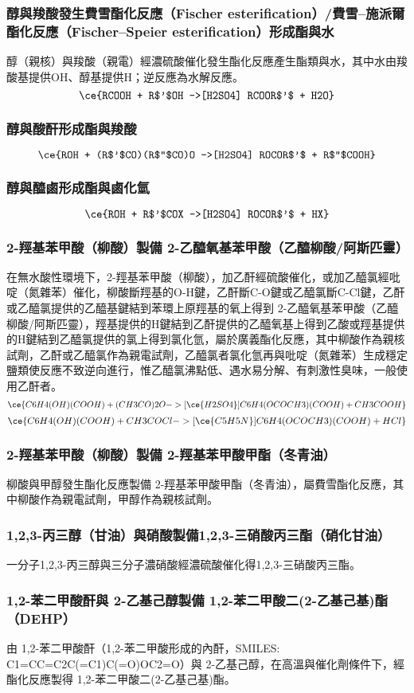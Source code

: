 \documentclass[a4paper,12pt]{report}
\begin{document}
\begin{itemize}
\subsubsection{醇與羧酸發生費雪酯化反應（Fischer esterification）/費雪–施派爾酯化反應（Fischer–Speier esterification）形成酯與水}
醇（親核）與羧酸（親電）經濃硫酸催化發生酯化反應產生酯類與水，其中水由羧酸基提供OH、醇基提供H；逆反應為水解反應。
\[\ce{RCOOH + R$'$OH ->[H2SO4] RCOOR$'$ + H2O}\]
\subsubsection{醇與酸酐形成酯與羧酸}
\[\ce{ROH + (R$'$CO)(R$''$CO)O ->[H2SO4] ROCOR$'$ + R$''$COOH}\]
\subsubsection{醇與醯鹵形成酯與鹵化氫}
\[\ce{ROH + R$'$COX ->[H2SO4] ROCOR$'$ + HX}\]
\subsubsection{2-羥基苯甲酸（柳酸）製備 2-乙醯氧基苯甲酸（乙醯柳酸/阿斯匹靈）}
在無水酸性環境下，2-羥基苯甲酸（柳酸），加乙酐經硫酸催化，或加乙醯氯經吡啶（氮雜苯）催化，柳酸斷羥基的O-H鍵，乙酐斷C-O鍵或乙醯氯斷C-Cl鍵，乙酐或乙醯氯提供的乙醯基鍵結到苯環上原羥基的氧上得到 2-乙醯氧基苯甲酸（乙醯柳酸/阿斯匹靈），羥基提供的H鍵結到乙酐提供的乙醯氧基上得到乙酸或羥基提供的H鍵結到乙醯氯提供的氯上得到氯化氫，屬於廣義酯化反應，其中柳酸作為親核試劑，乙酐或乙醯氯作為親電試劑，乙醯氯者氯化氫再與吡啶（氮雜苯）生成穩定鹽類使反應不致逆向進行，惟乙醯氯沸點低、遇水易分解、有刺激性臭味，一般使用乙酐者。
\[\ce{C6H4(OH)(COOH) + (CH3CO)2O ->[\ce{H2SO4}] C6H4(OCOCH3)(COOH) + CH3COOH}\]
\[\ce{C6H4(OH)(COOH) + CH3COCl ->[\ce{C5H5N}] C6H4(OCOCH3)(COOH) + HCl}\]
\subsubsection{2-羥基苯甲酸（柳酸）製備 2-羥基苯甲酸甲酯（冬青油）}
柳酸與甲醇發生酯化反應製備 2-羥基苯甲酸甲酯（冬青油），屬費雪酯化反應，其中柳酸作為親電試劑，甲醇作為親核試劑。
\subsubsection{1,2,3-丙三醇（甘油）與硝酸製備1,2,3-三硝酸丙三酯（硝化甘油）}
一分子1,2,3-丙三醇與三分子濃硝酸經濃硫酸催化得1,2,3-三硝酸丙三酯。
\subsubsection{1,2-苯二甲酸酐與 2-乙基己醇製備 1,2-苯二甲酸二(2-乙基己基)酯（DEHP）}
由 1,2-苯二甲酸酐（1,2-苯二甲酸形成的內酐，SMILES: C1=CC=C2C(=C1)C(=O)OC2=O）與 2-乙基己醇，在高溫與催化劑條件下，經酯化反應製得 1,2-苯二甲酸二(2-乙基己基)酯。

\end{itemize}
\end{document}
